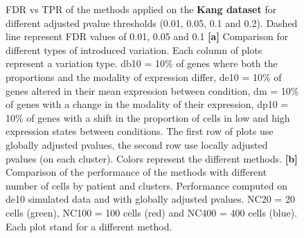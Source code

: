 \documentclass[a4paper, 11pt, twocolumn]{article}
\begin{document}
\begin{figure}[h]
	\caption{{\footnotesize FDR vs TPR of the methods applied on the \textbf{Kang dataset} for different adjusted pvalue thresholds (0.01, 0.05, 0.1 and 0.2). Dashed line represent FDR values of 0.01, 0.05 and 0.1 \textbf{[a]} Comparison for different types of introduced variation. Each column of plots represent a variation type. db10 = 10\% of genes where both the proportions and the modality of expression differ, de10 = 10\% of genes altered in their mean expression between condition, dm = 10\% of genes with a change in the modality of their expression, dp10 = 10\% of genes with a shift in the proportion of cells in low and high expression states between conditions. The first row of plots use globally adjusted pvalues, the second row use locally adjusted pvalues (on each cluster). Colors represent the different methods. \textbf{[b]} Comparison of the performance of the methods with different number of cells by patient and clusters. Performance computed on de10 simulated data and with globally adjusted pvalues. NC20 = 20 cells (green), NC100 = 100 cells (red) and NC400 = 400 cells (blue). Each plot stand for a different method.}}
	\label{fig:fdrtpr_combined_kang}
\end{figure}
\end{document}
